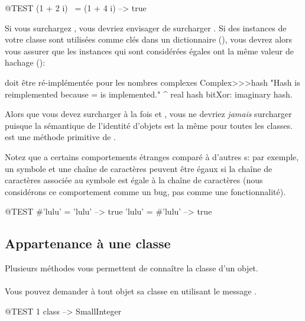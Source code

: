 \documentclass[a4paper,10pt,twoside]{book}
\begin{document}
\begin{code}{@TEST}
(1 + 2 i) ~= (1 + 4 i) --> true
\end{code}

Si vous surchargez \ct{=}, vous devriez envisager de surcharger
. Si des instances de votre classe sont
utilisées comme clés dans un dictionnaire (),
vous devrez alors vous assurer que les instances qui sont
considérées égales ont la même valeur de hachage ():

\begin{method}{ doit être ré-implémentée pour les nombres complexes}
Complex>>>hash
    "Hash is reimplemented because = is implemented."
    ^ real hash bitXor: imaginary hash.
\end{method}

Alors que vous devez surcharger à la fois \ct{=} et , vous
ne devriez \emph{jamais} surcharger \ct{==} puisque la sémantique de 
l'identité d'objets est la même pour toutes les classes.  \ct{==} est une 
méthode primitive de .

Notez que \pharo a certains comportements étranges comparé à d'autres \st{}s: 
par exemple, un symbole et une chaîne de caractères peuvent être égaux si 
la chaîne de caractères associée au symbole est égale à la chaîne de caractères 
(nous considérons ce comportement comme un bug, pas comme une fonctionnalité).

\begin{code}{@TEST}
#'lulu' = 'lulu' --> true
'lulu' = #'lulu' --> true
\end{code}


\subsection{Appartenance à une classe}
Plusieurs méthodes vous permettent de connaître la classe d'un objet.

\paragraph{} Vous pouvez demander à tout objet sa classe en utilisant le message .
\begin{code}{@TEST}
1 class --> SmallInteger
\end{code}
\end{document}
